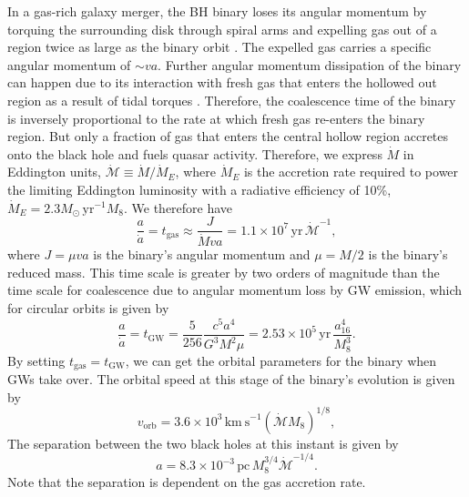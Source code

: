 \documentclass[a4paper,fleqn,usenatbib]{mnras}
\begin{document}
In a gas-rich galaxy merger, the BH binary loses its angular momentum
by torquing the surrounding disk through spiral arms and expelling gas
out of a region twice as large as the binary orbit
\citep{1994ApJ...421..651A, 2005ApJ...622L..93M, 2007PASJ...59..427H,
  2008ApJ...672...83M, 2009MNRAS.393.1423C}.  The expelled gas carries
a specific angular momentum of $\sim va$.  Further angular momentum
dissipation of the binary can happen due to its interaction with fresh
gas that enters the hollowed out region as a result of tidal torques
\citep{2008ApJ...672...83M, 2012ApJ...755...51N, 2012MNRAS.427.2680K,
  2012A&A...545A.127R}.  Therefore, the coalescence time of the binary
is inversely proportional to the rate at which fresh gas re-enters the
binary region.  But only a fraction of gas that enters the central
hollow region accretes onto the black hole and fuels quasar activity.
Therefore, we express $\dot M$ in Eddington units, $\dot{\mathcal
  M}\equiv\dot M /\dot M_E$, where $\dot M_E$ is the accretion rate
required to power the limiting Eddington luminosity with a radiative
efficiency of 10\%, $\dot M_E=2.3 M_\odot\, \mathrm{yr}^{-1}M_8$.  We
therefore have \citep{2010PhRvD..81d7503L, 2015MNRAS.448.3603D}
\begin{equation}
  \frac{a}{\dot a} = t_\mathrm{gas}\approx\frac{J}{\dot Mva}=1.1\times 10^7\,
  \mathrm{yr}\,\dot{\mathcal M}^{-1},
\end{equation}
where $J=\mu va$ is the binary's angular momentum and $\mu=M/2$ is the
binary's reduced mass.  This time scale is greater by two orders of
magnitude than the time scale for coalescence due to angular momentum
loss by GW emission, which for circular orbits is given by
\citep{1964PhRv..136.1224P}
\begin{equation}
  \frac{a}{\dot a} = t_\mathrm{GW} = \frac{5}{256}\frac{c^5a^4}{G^3M^2\mu}=2.53\times 10^5\,\mathrm{yr}\,\frac{a_{16}^4}{M_8^3}.
  \label{eqn:shrink}
\end{equation}
By setting $t_\mathrm{gas}=t_\mathrm{GW}$, we can get the orbital
parameters for the binary when GWs take over.  The orbital speed at
this stage of the binary's evolution is given by
\begin{equation}
  v_\mathrm{orb} = 3.6\times 10^3\, \mathrm{km~s}^{-1}(\dot{\mathcal{M}}M_8)^{1/8},
  \label{eqn:v}
\end{equation}
The separation between the two black holes at this instant is given by
\begin{equation}
  a = 8.3\times 10^{-3}\, \mathrm{pc}\, M_8^{3/4}\dot{\mathcal{M}}^{-1/4}.
  \label{eqn:a}
\end{equation}
Note that the separation is dependent on the gas accretion rate.  
\end{document}
